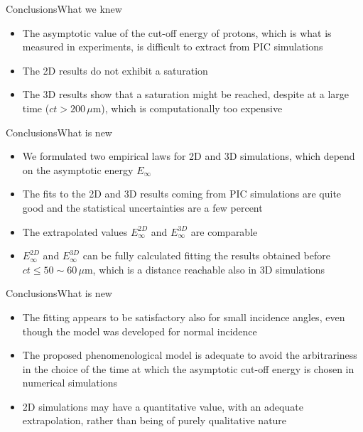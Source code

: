 \documentclass[final]{beamer}
\begin{document}
\begin{frame}{Conclusions}{What we knew}

\begin{itemize}
\item The asymptotic value of the cut-off energy of protons, which is what is measured in experiments, is difficult to extract from PIC simulations
\item The 2D results do not exhibit a saturation
\item The 3D results show that a saturation might be reached, despite at a large time ($ct > 200\,\mu$m), which is computationally too expensive
\end{itemize}

\end{frame}



\begin{frame}{Conclusions}{What is new}

\begin{itemize}
\item We formulated two empirical laws for 2D and 3D simulations, which depend on the asymptotic energy $E_\infty$
\item The fits to the 2D and 3D results coming from PIC simulations are quite good and the statistical uncertainties are a few percent
\item The extrapolated values $E_{\infty}^{2D}$ and $E_{\infty}^{3D}$ are comparable
\item $E_{\infty}^{2D}$ and $E_{\infty}^{3D}$ can be fully calculated fitting the results obtained before $ct \leq 50 \sim 60\,\mu$m, which is a distance reachable also in 3D simulations
\end{itemize}

\end{frame}



\begin{frame}{Conclusions}{What is new}

\begin{itemize}
\item The fitting appears to be satisfactory also for small incidence angles, even though the model was developed for normal incidence
\item The proposed phenomenological model is adequate to avoid the arbitrariness in the choice of the time at which the asymptotic cut-off energy is chosen in numerical simulations
\item 2D simulations may have a quantitative value, with an adequate extrapolation, rather than being of purely qualitative nature
\end{itemize}

\end{frame}
\end{document}
